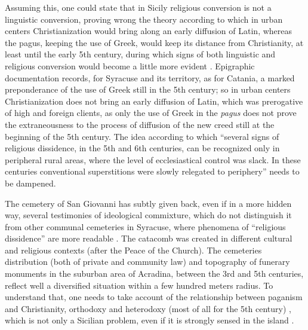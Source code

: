 \documentclass[amsthm,ebook]{saparticle}
\begin{document}
Assuming this, one could state that in Sicily religious conversion is not a linguistic conversion, proving wrong the theory according to which in urban centers Christianization would bring along an early diffusion of Latin, whereas the pagus, keeping the use of Greek, would keep its distance from Christianity, at least until the early 5th century, during which signs of both linguistic and religious conversion would become a little more evident \citep[545]{manganaro_greco_1993}. Epigraphic documentation records, for Syracuse and its territory, as for Catania, a marked preponderance of the use of Greek still in the 5th century; so in urban centers Christianization does not bring an early diffusion of Latin, which was prerogative of high and foreign clients, as only the use of Greek in the \emph{pagus} does not prove the extraneousness to the process of diffusion of the new creed still at the beginning of the 5th century. The idea according
to which ``several signs of religious dissidence, in the 5th and 6th centuries, can be recognized only in peripheral rural areas, where the level of ecclesiastical control was slack. In these centuries conventional superstitions were slowly relegated to periphery'' \citep{CRACCORUGGINI1998} needs to be dampened.

The cemetery of San Giovanni has subtly given back, even if in a more hidden way, several testimonies of ideological commixture, which do not distinguish it from other communal cemeteries in Syracuse, where phenomena of ``religious dissidence'' are more readable \citep{SGARLATA2003}. The catacomb was created in different cultural and religious contexts (after the Peace of the Church). The cemeteries distribution (both of private and community law) and topography of funerary monuments in the suburban area of Acradina, between the 3rd and 5th centuries, reflect well a diversified situation within a few hundred meters radius. To understand that, one needs to take account of the relationship between paganism and Christianity, orthodoxy and heterodoxy (most of all for the 5th century) \citep{MACMULLEN1997}, which is not only a Sicilian problem, even if it is strongly sensed in the island \citep[59]{GRECO1999}.

\nocite{Orsi:1896aa}



\end{document}
